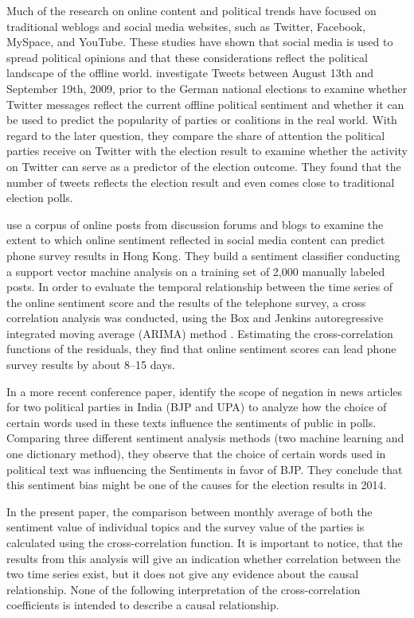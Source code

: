\documentclass[12pt,a4paper,notitlepage]{article}
\begin{document}
Much of the research on online content and political trends have focused on traditional weblogs and social media websites, such as Twitter, Facebook, MySpace, and YouTube. These studies have shown that social media is used to spread political opinions and that these considerations reflect the political landscape of the offline world. \citet{tumasjan_predicting_2010} investigate Tweets between August 13th and September 19th, 2009, prior to the German national elections to examine whether Twitter messages reflect the current offline political sentiment and whether it can be used to predict the popularity of parties or coalitions in the real world. With regard to the later question, they compare the share of attention the political parties receive on Twitter with the election result to examine whether the activity on Twitter can serve as a predictor of the election outcome. They found that the number of tweets reflects the election result and even comes close to traditional election polls.

\citet{fu_analyzing_2013} use a corpus of online posts from discussion forums and blogs to examine the extent to which online sentiment reflected in social media content can predict phone survey results in Hong Kong. They build a sentiment classifier conducting a support vector machine analysis on a training set of 2,000 manually labeled posts. In order to evaluate the temporal relationship between the time series of the online sentiment score and the results of the telephone survey, a cross correlation analysis was conducted, using the Box and Jenkins autoregressive integrated moving average (ARIMA) method \citep{box_time_2008}. Estimating the cross-correlation functions of the residuals, they find that online sentiment scores can lead phone survey results by about 8–15 days. 

In a more recent conference paper, \citet{padmaja_evaluating_2014} identify the scope of negation in news articles for two political parties in India (BJP and UPA) to analyze how the choice of certain words used in these texts influence the sentiments of public in polls. Comparing three different sentiment analysis methods (two machine learning and one dictionary method), they observe that the choice of certain words used in political text was influencing the Sentiments in favor of BJP. They conclude that this sentiment bias might be one of the causes for the election results in 2014.

In the present paper, the comparison between monthly average of both the sentiment value of individual topics and the survey value of the parties is calculated using the cross-correlation function. It is important to notice, that the results from this analysis will give an indication whether correlation between the two time series exist, but it does not give any evidence about the causal relationship. None of the following interpretation of the cross-correlation coefficients is intended to describe a causal relationship.
\end{document}
